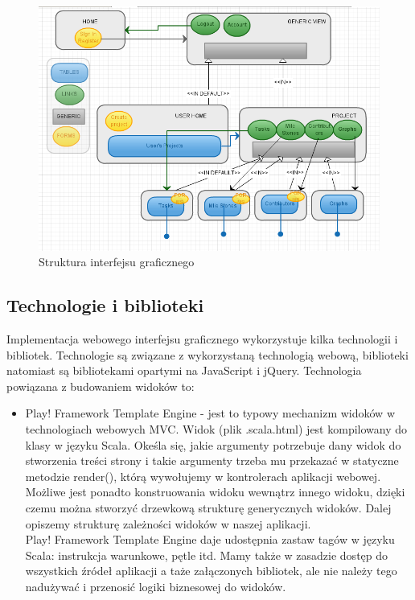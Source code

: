 \documentclass[a4paper,12pt,notitlepage]{mwrep}
\begin{document}
\begin{figure}[H]
\centering
\includegraphics[scale=0.5]{images/ui_chart.png}
\caption{Struktura interfejsu graficznego}
\label{fig:ui_chart}
\end{figure}


\subsection{Technologie i biblioteki}
Implementacja webowego interfejsu graficznego wykorzystuje kilka technologii i bibliotek. Technologie są związane z 
wykorzystaną technologią webową, biblioteki natomiast są bibliotekami opartymi na JavaScript i jQuery. Technologia 
powiązana z budowaniem widoków to:
\begin{itemize}
	\item	Play! Framework Template Engine - jest to typowy mechanizm widoków w technologiach webowych MVC. 
		Widok (plik .scala.html) jest kompilowany do klasy w języku Scala. Okeśla się, jakie argumenty potrzebuje 
		dany widok do stworzenia treści strony i takie argumenty trzeba mu przekazać w statyczne metodzie render(), 
		którą wywołujemy w kontrolerach aplikacji webowej. Możliwe jest ponadto konstruowania widoku wewnątrz innego 
		widoku, dzięki czemu można stworzyć drzewkową strukturę generycznych widoków. Dalej opiszemy strukturę zależności 
		widoków w naszej aplikacji. \\
		Play! Framework Template Engine daje udostępnia zastaw tagów w języku Scala: instrukcja warunkowe, pętle itd. Mamy 
		także w zasadzie dostęp do wszystkich źródeł aplikacji a taże załączonych bibliotek, ale nie należy tego nadużywać 
		i przenosić logiki biznesowej do widoków.
\end{itemize}
\end{document}
